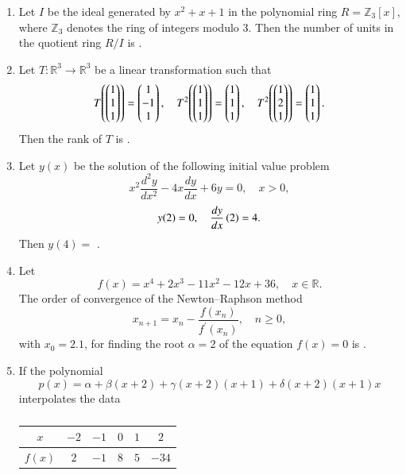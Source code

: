 \documentclass[journal,12pt,onecolumn]{IEEEtran}
\theoremstyle{remark}
\begin{document}
\begin{enumerate}[start=1, label=Q.\arabic*]
\item Let $I$ be the ideal generated by $x^{2}+x+1$ in the polynomial ring $R=\mathbb{Z}_{3}[x]$, where $\mathbb{Z}_{3}$ denotes the ring of integers modulo $3$.  
Then the number of units in the quotient ring $R/I$ is \underline{\hspace{2cm}}.

\hfill{}


\item Let $T : \mathbb{R}^{3}\to \mathbb{R}^{3}$ be a linear transformation such that
\[
T\!\left(\begin{pmatrix}1\\1\\1\end{pmatrix}\right)=\begin{pmatrix}1\\-1\\1\end{pmatrix},\quad 
T^{2}\!\left(\begin{pmatrix}1\\1\\1\end{pmatrix}\right)=\begin{pmatrix}1\\1\\1\end{pmatrix},\quad 
T^{2}\!\left(\begin{pmatrix}1\\2\\1\end{pmatrix}\right)=\begin{pmatrix}1\\1\\1\end{pmatrix}.
\]
Then the rank of $T$ is \underline{\hspace{2cm}}.

\hfill{}
\item Let $y(x)$ be the solution of the following initial value problem
\[
x^{2}\dfrac{d^{2}y}{dx^{2}}-4x\dfrac{dy}{dx}+6y=0,\quad x>0,
\]
\[
y(2)=0,\quad \dfrac{dy}{dx}\left(2\right)=4.
\]
Then $y(4)=$ \underline{\hspace{2cm}}.

\hfill{}


\item Let 
\[
f(x)=x^{4}+2x^{3}-11x^{2}-12x+36,\quad x \in \mathbb{R}.
\]
The order of convergence of the Newton–Raphson method
\[
x_{n+1}=x_{n}-\dfrac{f(x_{n})}{f^{\prime}(x_{n})},\quad n \ge 0,
\]
with $x_{0}=2.1$, for finding the root $\alpha=2$ of the equation $f(x)=0$ is \underline{\hspace{2cm}}.

\hfill{}


\item If the polynomial
\[
p(x)=\alpha+\beta(x+2)+\gamma(x+2)(x+1)+\delta(x+2)(x+1)x
\]
interpolates the data
\begin{table}[H]
\centering
\caption*{}
\label{tab:interp}
\begin{tabular}{|c|c|c|c|c|c|}
\hline
$x$ & $-2$ & $-1$ & $0$ & $1$ & $2$ \\ \hline
$f(x)$ & $2$ & $-1$ & $8$ & $5$ & $-34$ \\ \hline
\end{tabular}
\end{table}


\end{enumerate}
\end{document}
